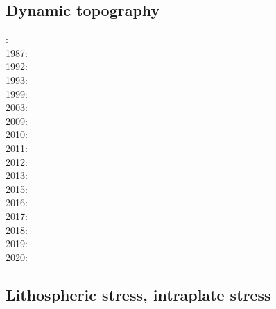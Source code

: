 {\scriptsize
\noindent
\cite{werr07}
\cite{jaml10}
\cite{rera11}
\cite{matv15}
\cite{gubg19}
}

\subsection{Dynamic topography} 

{\scriptsize
{}: \cite{hacr85}\\
1987: \cite{repa87}\\
1992: \cite{kiha92}\\
1993: \cite{gurn93}\cite{gurn93b}\\
1999: \cite{bumo99}\\
2003: \cite{cogu03}\\
2009: \cite{cohu09}\\
2010: \cite{bofb10}\cite{brau10}\cite{stfh10}\cite{shml10}\\
2011: \cite{rapy11}\\
2012: \cite{shlm12}\cite{zhzf12}\\
2013: \cite{brrs13}\cite{flgm13}\\
2015: \cite{aupm15}\cite{kiff15}\cite{dali15}\\
2016: \cite{howa16}\cite{gvfb16}\cite{yagu16}\cite{stei16}\cite{cogb16}\\
2017: \cite{yamm17}\cite{aumh17}\cite{grrb17}\\
2018: \cite{osss18}\cite{vibc18}\\
2019: \cite{deli19}\cite{davk19}\cite{bore19}\\
2020: \cite{braf20}
}

\subsection{Lithospheric stress, intraplate stress}


